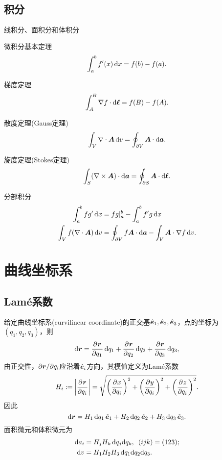 \subsection{积分}
\label{ssec:integral calculus}

\begin{compactitem}
	\item 线积分、面积分和体积分
	\item 微积分基本定理
	\[
        \int_a^b f'(x)\d x=f(b)-f(a).
    \]
    \item 梯度定理
    \begin{align}
        \int_A^B\nabla f\cdot\d\bm\ell=f(B)-f(A).
    \end{align}
    \item 散度定理(Gauss定理)
    \begin{align}\label{eqn:div}
        \int_V\div\bm A\d v=\oint_{\p V}\bm A\cdot\d\bm a.
    \end{align}
    \item 旋度定理(Stokes定理)
    \begin{align}\label{eqn:curl}
        \int_S(\curl\bm A)\cdot\d\bm a=\oint_{\p S}\bm A\cdot\d\bm\ell.
    \end{align}
    \item 分部积分
    \begin{align}\notag
        \int_a^bfg'\d x&=fg|_a^b-\int_a^bf'g\d x\\
        \int_Vf(\div\bm A)\d v&=\oint_{\p V}f\bm A\cdot\d\bm a-\int_V\bm A\cdot\nabla f\d v.
    \end{align}
\end{compactitem}

\section{曲线坐标系}
\label{sec:curvilinear coordinates}

\subsection{Lam\'e系数}

给定曲线坐标系(curvilinear coordinate)的正交基$\nvec e_1,\nvec e_2,\nvec e_3$，点的坐标为$(q_1,q_2,q_3)$，则
\[
    \d\bm r=\pv{\bm r}{q_1}\d q_1+\pv{\bm r}{q_2}\d q_2+\pv{\bm r}{q_3}\d q_3,
\]
由正交性，$\p\bm r/\p q_i$应沿着$\nvec e_i$方向，其模值定义为Lam\'e系数
\begin{equation}
    H_i:=\abs{\pv{\bm r}{q_i}}=\sqrt{\biggkh{\pv x{q_i}}^2+\biggkh{\pv y{q_i}}^2+\biggkh{\pv z{q_i}}^2}.
\end{equation}
因此 
\begin{equation}
    \d\bm r=H_1\d q_1\uvec e_1+H_2\d q_2\uvec e_2+H_3\d q_3\uvec e_3.
\end{equation}
面积微元和体积微元为
\begin{align}
    \d a_i&=H_jH_k\d q_j\nd q_k,\enspace (ijk)=(123);\\
    \d v&=H_1H_2H_3\d q_1\nd q_2\nd q_3.
\end{align}

